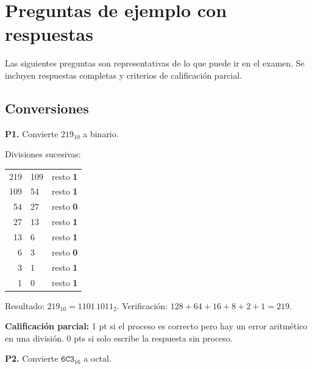 \documentclass[12pt, oneside]{article}
\begin{document}
\newpage

\section{Preguntas de ejemplo con respuestas}

Las siguientes preguntas son representativas de lo que puede ir en el examen.
Se incluyen respuestas completas y criterios de calificación parcial.

\subsection{Conversiones}

\textbf{P1.} Convierte $219_{10}$ a binario.

\begin{notaprofesor}
  Divisiones sucesivas:
  \begin{center}
  \begin{tabular}{r@{$\;\div 2 =\;$}l@{\quad}l}
    219 & 109 & resto \textbf{1} \\
    109 & 54  & resto \textbf{1} \\
    54  & 27  & resto \textbf{0} \\
    27  & 13  & resto \textbf{1} \\
    13  & 6   & resto \textbf{1} \\
    6   & 3   & resto \textbf{0} \\
    3   & 1   & resto \textbf{1} \\
    1   & 0   & resto \textbf{1} \\
  \end{tabular}
  \end{center}
  Resultado: $219_{10} = 1101\,1011_2$.
  Verificación: $128+64+16+8+2+1 = 219$. \checkmark

  \textbf{Calificación parcial:} 1 pt si el proceso es correcto pero hay
  un error aritmético en una división.  0 pts si solo escribe la respuesta
  sin proceso.
\end{notaprofesor}

\medskip
\textbf{P2.} Convierte $\mathtt{6C3}_{16}$ a octal.
\end{document}
